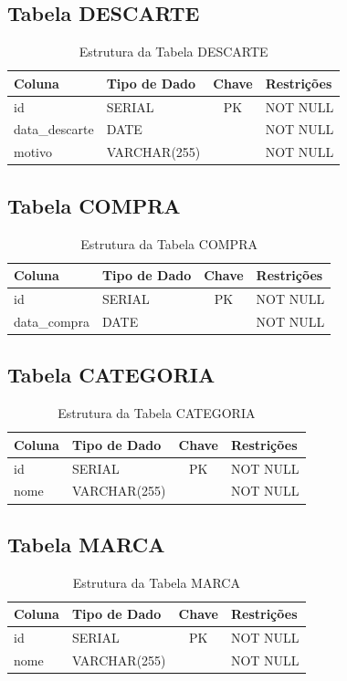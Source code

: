 \documentclass[
	12pt,				%
	openany,			%
	oneside,			%
	a4paper,			%
	english,			%
	french,				%
	spanish,			%
	brazil				%
	]{abntex2}
\begin{document}
\begin{apendicesenv}
\subsection{Tabela DESCARTE}
\begin{longtable}{|l|l|c|p{6cm}|}
    \caption{Estrutura da Tabela DESCARTE} \label{tab:dic_descarte} \\
    \hline \textbf{Coluna} & \textbf{Tipo de Dado} & \textbf{Chave} & \textbf{Restrições} \\ \hline
    \endhead
    id & SERIAL & PK & NOT NULL \\ \hline
    data\_descarte & DATE & & NOT NULL \\ \hline
    motivo & VARCHAR(255) & & NOT NULL \\ \hline
\end{longtable}

\subsection{Tabela COMPRA}
\begin{longtable}{|l|l|c|p{6cm}|}
    \caption{Estrutura da Tabela COMPRA} \label{tab:dic_compra} \\
    \hline \textbf{Coluna} & \textbf{Tipo de Dado} & \textbf{Chave} & \textbf{Restrições} \\ \hline
    \endhead
    id & SERIAL & PK & NOT NULL \\ \hline
    data\_compra & DATE & & NOT NULL \\ \hline
\end{longtable}

\subsection{Tabela CATEGORIA}
\begin{longtable}{|l|l|c|p{6cm}|}
    \caption{Estrutura da Tabela CATEGORIA} \label{tab:dic_categoria} \\
    \hline \textbf{Coluna} & \textbf{Tipo de Dado} & \textbf{Chave} & \textbf{Restrições} \\ \hline
    \endhead
    id & SERIAL & PK & NOT NULL \\ \hline
    nome & VARCHAR(255) & & NOT NULL \\ \hline
\end{longtable}

\subsection{Tabela MARCA}
\begin{longtable}{|l|l|c|p{6cm}|}
    \caption{Estrutura da Tabela MARCA} \label{tab:dic_marca} \\
    \hline \textbf{Coluna} & \textbf{Tipo de Dado} & \textbf{Chave} & \textbf{Restrições} \\ \hline
    \endhead
    id & SERIAL & PK & NOT NULL \\ \hline
    nome & VARCHAR(255) & & NOT NULL \\ \hline
\end{longtable}

\end{apendicesenv}
\end{document}
